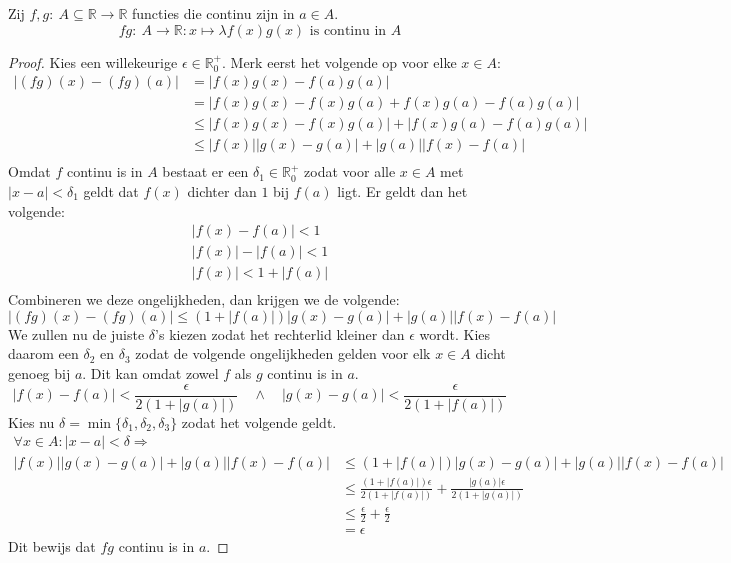 \documentclass[main.tex]{subfiles}
\begin{document}
\begin{pr}
  \label{pr:product-continu}
  Zij $f,g:\ A \subseteq \mathbb{R} \rightarrow \mathbb{R}$ functies die continu zijn in $a\in A$.
  \[ fg:\ A \rightarrow \mathbb{R}: x \mapsto \lambda f(x)g(x) \text{ is continu in } A \]

  \begin{proof}
    Kies een willekeurige $\epsilon \in \mathbb{R}_{0}^{+}$.
    Merk eerst het volgende op voor elke $x\in A$:
    \[
    \begin{array}{rl}
    |(fg)(x) - (fg)(a)| &= |f(x)g(x) - f(a)g(a)|\\
                        &= |f(x)g(x) - f(x)g(a) + f(x)g(a) - f(a)g(a)|\\
                        &\le |f(x)g(x) - f(x)g(a)| + |f(x)g(a) - f(a)g(a)|\\
                        &\le |f(x)||g(x)-g(a)| + |g(a)||f(x)-f(a)|\\
    \end{array}
    \]
    Omdat $f$ continu is in $A$ bestaat er een $\delta_{1} \in \mathbb{R}_{0}^{+}$ zodat voor alle $x\in A$ met $|x-a|<\delta_{1}$ geldt dat $f(x)$ dichter dan $1$ bij $f(a)$ ligt.
    Er geldt dan het volgende:
    \[
    \begin{array}{c}
      |f(x)-f(a)|<1\\
      |f(x)|-|f(a)|<1\\
      |f(x)|<1+|f(a)|\\
    \end{array}
    \]
    Combineren we deze ongelijkheden, dan krijgen we de volgende:
    \[ |(fg)(x) - (fg)(a)| \le (1+|f(a)|)|g(x)-g(a)| + |g(a)||f(x)-f(a)| \]
    We zullen nu de juiste $\delta$'s kiezen zodat het rechterlid kleiner dan $\epsilon$ wordt.
    Kies daarom een $\delta_{2}$ en $\delta_{3}$ zodat de volgende ongelijkheden gelden voor elk $x\in A$ dicht genoeg bij $a$.
    Dit kan omdat zowel $f$ als $g$ continu is in $a$.
    \[ 
    |f(x)-f(a)| < \frac{\epsilon}{2(1+|g(a)|)} \quad\wedge\quad |g(x)-g(a)| < \frac{\epsilon}{2(1+|f(a)|)}
    \]
    Kies nu $\delta = \min\{\delta_{1},\delta_{2},\delta_{3}\}$ zodat het volgende geldt.
    \[ 
    \begin{array}{rl}
    \forall x\in A: |x-a|<\delta \Rightarrow \\
    |f(x)||g(x)-g(a)| + |g(a)||f(x)-f(a)| &\le (1+|f(a)|)|g(x)-g(a)| + |g(a)||f(x)-f(a)|\\
                                          &\le \frac{(1+|f(a)|)\epsilon}{2(1+|f(a)|)} + \frac{|g(a)|\epsilon}{2(1+|g(a)|)}\\
                                          &\le \frac{\epsilon}{2} + \frac{\epsilon}{2}\\
                                          &= \epsilon
    \end{array}
    \]
    Dit bewijs dat $fg$ continu is in $a$.
  \end{proof}
\end{pr}
\end{document}
